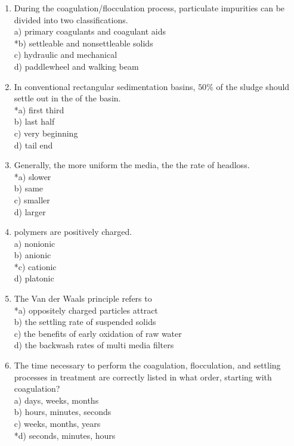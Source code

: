 \begin{enumerate}
  \item During the coagulation/flocculation process, particulate impurities can be divided into two classifications.\\
a) primary coagulants and coagulant aids\\
*b) settleable and nonsettleable solids\\
c) hydraulic and mechanical\\
d) paddlewheel and walking beam\\
  \item In conventional rectangular sedimentation basins, $50 \%$ of the sludge should settle out in the of the basin.\\
*a) first third\\
b) last half\\
c) very beginning\\
d) tail end\\
  \item Generally, the more uniform the media, the the rate of headloss.\\
*a) slower\\
b) same\\
c) smaller\\
d) larger\\
  \item polymers are positively charged.\\
a) nonionic\\
b) anionic\\
*c) cationic\\
d) platonic\\
  \item The Van der Waals principle refers to\\
*a) oppositely charged particles attract\\
b) the settling rate of suspended solids\\
c) the benefits of early oxidation of raw water\\
d) the backwash rates of multi media filters\\
  \item The time necessary to perform the coagulation, flocculation, and settling processes in treatment are correctly listed in what order, starting with coagulation?\\
a) days, weeks, months\\
b) hours, minutes, seconds\\
c) weeks, months, years\\
*d) seconds, minutes, hours\\

\end{enumerate}
